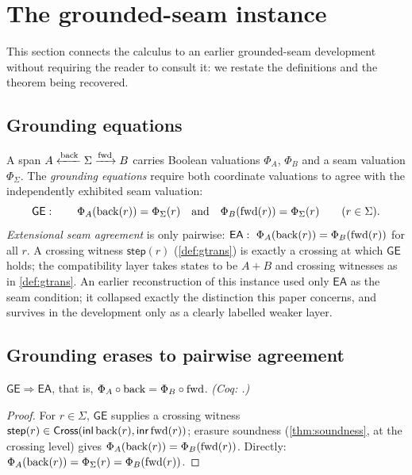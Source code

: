 \section{The grounded-seam instance}\label{sec:seams}

This section connects the calculus to an earlier grounded-seam development \cite{moore2026} without requiring the reader to consult it: we restate the definitions and the theorem being recovered.

\subsection{Grounding equations}
A span $A \xleftarrow{\mathrm{back}} \Sigma \xrightarrow{\mathrm{fwd}} B$ carries Boolean valuations $\Phi_A$, $\Phi_B$ and a seam valuation $\Phi_\Sigma$. The \emph{grounding equations} require both coordinate valuations to agree with the independently exhibited seam valuation:
\[
\mathsf{GE}:\qquad \Phi_A(\mathrm{back}(r)) = \Phi_\Sigma(r) \quad\text{and}\quad \Phi_B(\mathrm{fwd}(r)) = \Phi_\Sigma(r) \qquad (r \in \Sigma).
\]
\emph{Extensional seam agreement} is only pairwise: $\mathsf{EA}:\ \Phi_A(\mathrm{back}(r)) = \Phi_B(\mathrm{fwd}(r))$ for all $r$. A crossing witness $\mathsf{step}(r)$ (\cref{def:gtrans}) is exactly a crossing at which $\mathsf{GE}$ holds; the compatibility layer takes states to be $A + B$ and crossing witnesses as in \cref{def:gtrans}. An earlier reconstruction of this instance used only $\mathsf{EA}$ as the seam condition; it collapsed exactly the distinction this paper concerns, and survives in the development only as a clearly labelled weaker layer.

\subsection{Grounding erases to pairwise agreement}
\begin{prop}\label{prop:groundingerases}
$\mathsf{GE} \Longrightarrow \mathsf{EA}$, that is, $\Phi_A \circ \mathrm{back} = \Phi_B \circ \mathrm{fwd}$. \emph{(Coq: .)}
\end{prop}
\begin{proof}
For $r \in \Sigma$, $\mathsf{GE}$ supplies a crossing witness $\mathsf{step}(r) \in \mathsf{Cross}(\mathsf{inl}\,\mathrm{back}(r), \mathsf{inr}\,\mathrm{fwd}(r))$; erasure soundness (\cref{thm:soundness}, at the crossing level) gives $\Phi_A(\mathrm{back}(r)) = \Phi_B(\mathrm{fwd}(r))$. Directly: $\Phi_A(\mathrm{back}(r)) = \Phi_\Sigma(r) = \Phi_B(\mathrm{fwd}(r))$.
\end{proof}

